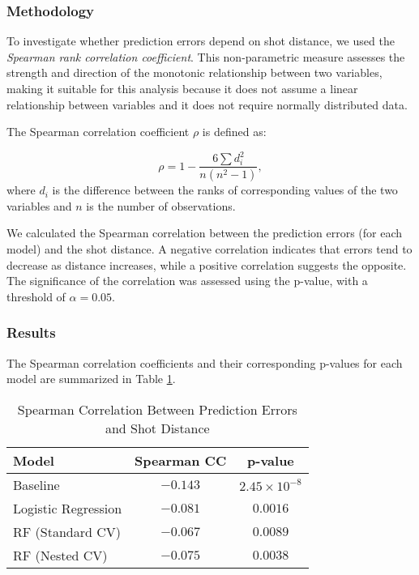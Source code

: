 \documentclass[fleqn,moreauthors,10pt]{ds_report}
\begin{document}
\subsubsection*{Methodology}
To investigate whether prediction errors depend on shot distance, we used the \textit{Spearman rank correlation coefficient}. This non-parametric measure assesses the strength and direction of the monotonic relationship between two variables, making it suitable for this analysis because it does not assume a linear relationship between variables and it does not require normally distributed data.

The Spearman correlation coefficient \( \rho \) is defined as:

\[
\rho = 1 - \frac{6 \sum d_i^2}{n(n^2 - 1)},
\]
where \( d_i \) is the difference between the ranks of corresponding values of the two variables and \( n \) is the number of observations.

We calculated the Spearman correlation between the prediction errors (for each model) and the shot distance. A negative correlation indicates that errors tend to decrease as distance increases, while a positive correlation suggests the opposite. The significance of the correlation was assessed using the p-value, with a threshold of \( \alpha = 0.05 \).

\subsubsection*{Results}

The Spearman correlation coefficients and their corresponding p-values for each model are summarized in Table \ref{tab:spearman_results}.

\begin{table}[h]
\centering
\caption{Spearman Correlation Between Prediction Errors and Shot Distance}
\begin{tabular}{|l|c|c|}
\hline
\textbf{Model} & \textbf{Spearman CC} & \textbf{p-value} \\ \hline
Baseline & \(-0.143\) & \(2.45 \times 10^{-8}\) \\ \hline
Logistic Regression & \(-0.081\) & \(0.0016\) \\ \hline
RF (Standard CV) & \(-0.067\) & \(0.0089\) \\ \hline
RF (Nested CV) & \(-0.075\) & \(0.0038\) \\ \hline
\end{tabular}
\label{tab:spearman_results}
\end{table}
\end{document}
